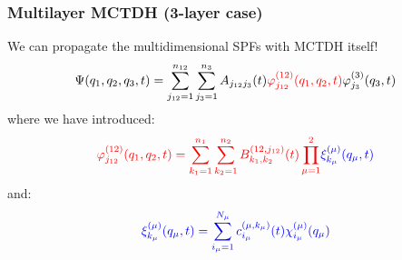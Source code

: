 \documentclass{beamer}
\begin{document}
\begin{frame}
  \frametitle{Multilayer MCTDH (3-layer case)}
We can propagate the multidimensional SPFs with MCTDH itself!
\begin{equation}
	\Psi(q_1, q_2, q_3, t) = \sum_{j_{12}=1}^{n_{12}}\sum_{j_3 = 1}^{n_3}A_{j_{12}j_3}(t)\textcolor{red}{\varphi^{(12)}_{j_{12}}(q_1,q_2,t)}\varphi^{(3)}_{j_{3}}(q_3,t)
\end{equation}
where we have introduced:
\begin{equation}
	\textcolor{red}{\varphi^{(12)}_{j_{12}}(q_1,q_2,t) = \sum_{k_1 = 1}^{n_1}\sum_{k_2=1}^{n_2}B_{k_1,k_2}^{(12,j_{12})}(t)\prod_{\mu=1}^2} \textcolor{blue}{\xi_{k_{\mu}}^{(\mu)}(q_{\mu},t)}
\end{equation}
and:
\begin{equation}
	\textcolor{blue}{\xi_{k_{\mu}}^{(\mu)}(q_{\mu},t) = \sum_{i_{\mu}=1}^{N_{\mu}} c_{i_{\mu}}^{(\mu,k_{\mu})}(t)\chi_{i_{\mu}}^{(\mu)}(q_{\mu})}
\end{equation}
\end{frame}
\end{document}
